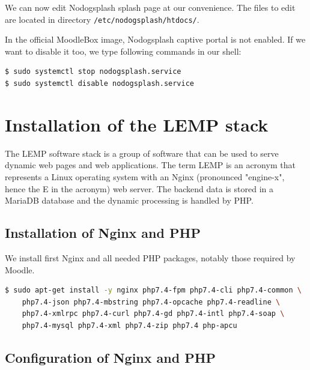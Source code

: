 \documentclass[12pt]{article}
\begin{document}
We can now edit Nodogsplash splash page at our convenience.
The files to edit are located in directory \lstinline{/etc/nodogsplash/htdocs/}.

In the official MoodleBox image, Nodogsplash captive portal is not enabled.
If we want to disable it too, we type following commands in our shell:
\begin{lstlisting}[language=bash]
$ sudo systemctl stop nodogsplash.service
$ sudo systemctl disable nodogsplash.service
\end{lstlisting}

\section{Installation of the LEMP stack}

The LEMP software stack is a group of software that can be used to serve dynamic web pages and web applications.
The term LEMP is an acronym that represents a Linux operating system with an Nginx (pronounced "engine-x", hence the E in the acronym) web server.
The backend data is stored in a MariaDB database and the dynamic processing is handled by PHP.

\subsection{Installation of Nginx and PHP}\label{ssec-lemp}

We install first Nginx and all needed PHP packages, notably those required by Moodle.

\begin{lstlisting}[language=bash]
$ sudo apt-get install -y nginx php7.4-fpm php7.4-cli php7.4-common \
    php7.4-json php7.4-mbstring php7.4-opcache php7.4-readline \
    php7.4-xmlrpc php7.4-curl php7.4-gd php7.4-intl php7.4-soap \
    php7.4-mysql php7.4-xml php7.4-zip php7.4 php-apcu
\end{lstlisting}

\subsection{Configuration of Nginx and PHP}\label{ssec-nginx-php}
\end{document}
